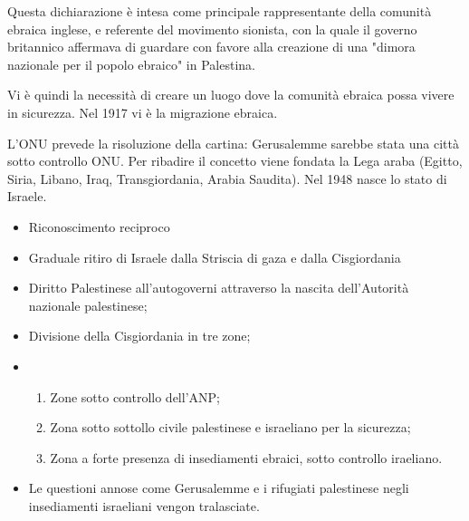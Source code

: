 \documentclass[a4paper]{article}
\begin{document}
Questa dichiarazione è intesa come principale rappresentante della
comunità ebraica inglese, e referente del movimento
sionista, con la quale il governo britannico affermava di guardare
con favore alla creazione di una "dimora nazionale per il popolo ebraico" in Palestina.


Vi è quindi la necessità di creare un luogo dove la comunità ebraica possa vivere in sicurezza.
Nel 1917 vi è la migrazione ebraica.

L'ONU prevede la risoluzione della cartina:
Gerusalemme sarebbe stata una città sotto controllo ONU.
Per ribadire il concetto viene fondata la Lega araba
(Egitto, Siria, Libano, Iraq, Transgiordania, Arabia Saudita).
Nel 1948 nasce lo stato di Israele. 



\begin{itemize}
    \item Riconoscimento reciproco
    \item Graduale ritiro di Israele dalla Striscia di gaza e dalla Cisgiordania
    \item Diritto Palestinese all'autogoverni attraverso la nascita dell'Autorità nazionale palestinese;
    \item Divisione della Cisgiordania in tre zone;
    \item \begin{enumerate}
        \item Zone sotto controllo dell'ANP;
        \item Zona sotto sottollo civile palestinese e israeliano per la sicurezza;
        \item Zona a forte presenza di insediamenti ebraici, sotto controllo iraeliano.
    \end{enumerate}
    \item Le questioni annose come Gerusalemme e i rifugiati palestinese negli insediamenti israeliani vengon tralasciate.
\end{itemize}
\end{document}
